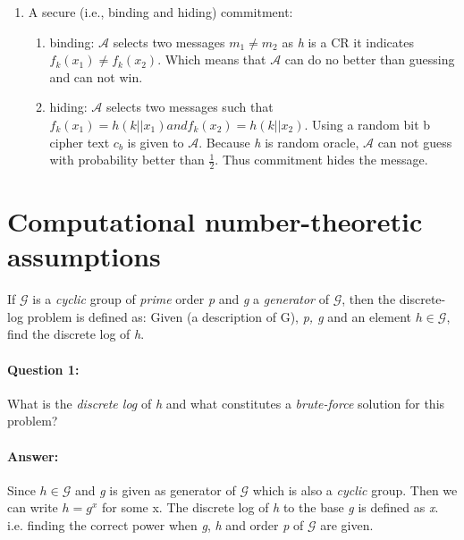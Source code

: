 \documentclass{article}
\begin{document}
\begin{enumerate}
            \item A secure (i.e., binding and hiding) commitment: \newline
                \begin{enumerate}
                    \item binding: $\mathcal{A}$ selects two messages $m_1 \neq m_2$ as \emph{h} is a CR it indicates $f_k(x_1) \neq f_k(x_2)$. Which means that $\mathcal{A}$ can do no better than guessing and can not win.
                    \item hiding: $\mathcal{A}$ selects two messages such that $f_k(x_1) = h(k||x_1) and f_k(x_2) = h(k||x_2)$. Using a random bit b cipher text $c_b$ is given to $\mathcal{A}$. Because \emph{h} is random oracle, $\mathcal{A}$ can not guess with probability better than $\frac{1}{2}$. Thus commitment hides the message.
                \end{enumerate}
            
        \end{enumerate}
    
\section{Computational number-theoretic assumptions}
    If $\mathcal{G}$ is a \emph{cyclic} group of \emph{prime} order \emph{p} and \emph{g} a \emph{generator} of $\mathcal{G}$, then the discrete-log problem is defined as: Given (a description of G), \emph{p, g} and an element $h \in \mathcal{G}$, find the discrete log of \emph{h}.
    
    \paragraph{Question 1:} What is the \emph{discrete log} of \emph{h} and what constitutes a \emph{brute-force} solution for this problem?
    \paragraph{Answer: \newline}
        Since $h \in \mathcal{G}$ and \emph{g} is given as generator of $\mathcal{G}$ which is also a \emph{cyclic} group. Then we can write $h = g^x$ for some x. \newline
        The discrete log of \emph{h} to the base \emph{g} is defined as \emph{x}. i.e. finding the correct power when \emph{g}, \emph{h} and order \emph{p} of $\mathcal{G}$ are given.\newline
        
\end{document}
